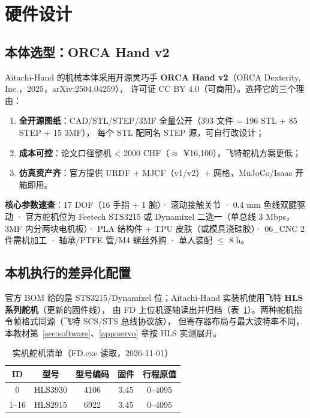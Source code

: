 \section{硬件设计}

\subsection{本体选型：ORCA Hand v2}
Aitachi-Hand 的机械本体采用开源灵巧手 \textbf{ORCA Hand v2}（ORCA Dexterity, Inc.，2025，arXiv:2504.04259），
许可证 CC BY 4.0（可商用）。选择它的三个理由：

\begin{enumerate}
  \item \textbf{全开源图纸}：CAD/STL/STEP/3MF 全量公开（393 文件 = 196 STL + 85 STEP + 15 3MF），
        每个 STL 配同名 STEP 源，可自行改设计；
  \item \textbf{成本可控}：论文口径整机 < 2000 CHF（$\approx$ ¥16,100），飞特舵机方案更低；
  \item \textbf{仿真资产齐}：官方提供 URDF + MJCF（v1/v2）+ 网格，MuJoCo/Isaac 开箱即用。
\end{enumerate}

\begin{keybox}
\textbf{核心参数速查}：17 DOF（16 手指 + 1 腕）· 滚动接触关节 · 0.4 mm 鱼线双腱驱动 ·
官方舵机位为 Feetech STS3215 或 Dynamixel 二选一（单总线 3 Mbps，3MF 内分两块电机板）·
PLA 结构件 + TPU 皮肤（或模具浇硅胶）· 06\_CNC 2 件需机加工 · 轴承/PTFE 管/M4 螺丝外购 · 单人装配 $\le$ 8 h。
\end{keybox}

\subsection{本机执行的差异化配置}
官方 BOM 给的是 STS3215/Dynamixel 位；Aitachi-Hand 实装机使用飞特 \textbf{HLS 系列舵机}（更新的固件线），
由 FD 上位机逐轴读出并归档（表~\ref{tab:servo-models}）。两种舵机指令帧格式同源（飞特 SCS/STS 总线协议族），
但寄存器布局与最大波特率不同，本教材第~\ref{sec:software}、\ref{app:servo} 章按 HLS 实测展开。

\begin{table}[h]\centering
\caption{实机舵机清单（FD.exe 读取，2026-11-01）}\label{tab:servo-models}
\begin{tabular}{ccccc}
\toprule
ID & 型号 & 型号编码 & 固件 & 行程原值 \\
\midrule
0 & HLS3930 & 4106 & 3.45 & 0--4095 \\
1--16 & HLS2915 & 6922 & 3.45 & 0--4095 \\
\bottomrule
\end{tabular}
\end{table}

